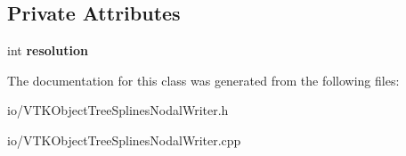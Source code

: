 \subsection*{Private Attributes}
\begin{DoxyCompactItemize}
\item 
int {\bfseries resolution}\hypertarget{class_v_t_k_object_tree_splines_nodal_writer_af12e22dc6d4affdcf8d3109d84774b01}{}\label{class_v_t_k_object_tree_splines_nodal_writer_af12e22dc6d4affdcf8d3109d84774b01}

\end{DoxyCompactItemize}


The documentation for this class was generated from the following files\+:\begin{DoxyCompactItemize}
\item 
io/V\+T\+K\+Object\+Tree\+Splines\+Nodal\+Writer.\+h\item 
io/V\+T\+K\+Object\+Tree\+Splines\+Nodal\+Writer.\+cpp\end{DoxyCompactItemize}

